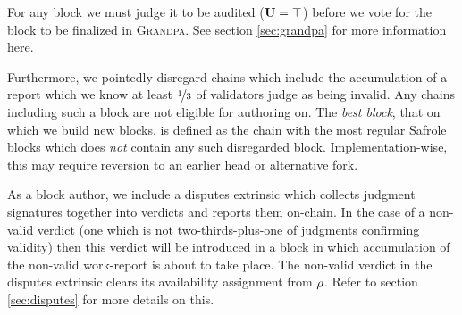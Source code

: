 For any block we must judge it to be audited (\ie $\mathbf{U} = \top$) before we vote for the block to be finalized in \textsc{Grandpa}. See section \ref{sec:grandpa} for more information here.

Furthermore, we pointedly disregard chains which include the accumulation of a report which we know at least $\nicefrac{1}{3}$ of validators judge as being invalid. Any chains including such a block are not eligible for authoring on. The \emph{best block}, \ie that on which we build new blocks, is defined as the chain with the most regular Safrole blocks which does \emph{not} contain any such disregarded block. Implementation-wise, this may require reversion to an earlier head or alternative fork.

As a block author, we include a disputes extrinsic which collects judgment signatures together into verdicts and reports them on-chain. In the case of a non-valid verdict (\ie one which is not two-thirds-plus-one of judgments confirming validity) then this verdict will be introduced in a block in which accumulation of the non-valid work-report is about to take place. The non-valid verdict in the disputes extrinsic clears its availability assignment from $\rho$. Refer to section \ref{sec:disputes} for more details on this.




